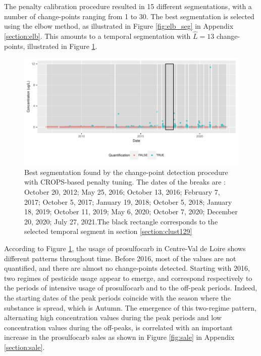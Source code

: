 The penalty calibration procedure resulted in 15 different segmentations, with a number of change-points ranging from 1 to 30. The best segmentation is selected using the elbow method, as illustrated in Figure \ref{fig:elb_seg} in Appendix \ref{section:elb}. This amounts to a temporal segmentation with $\hat L=13$ change-points, illustrated in Figure \ref{fig:seg}. 
 
\begin{figure}[ht]
  \centering
  \includegraphics[]{figs/Chap5/Seg_opt.pdf}
  \caption{Best segmentation found by the change-point detection procedure with CROPS-based penalty tuning. The dates of the breaks are : October 20, 2012; May 25, 2016; October 13, 2016; February 7, 2017; October 5, 2017; January 19, 2018; October 5, 2018; January 18, 2019; October 11, 2019; May 6, 2020; October 7, 2020; December 20, 2020; July 27, 2021.The black rectangle corresponds to the selected temporal segment in section \ref{section:clust129}}\label{fig:seg}
\end{figure}

According to Figure \ref{fig:seg}, the usage of prosulfocarb in Centre-Val de Loire shows different patterns throughout time. Before 2016, most of the values are not quantified, and there are almost no change-points detected. Starting with 2016, two regimes of pesticide usage appear to emerge, and correspond respectively to the periods of intensive usage of prosulfocarb and to the off-peak periods. Indeed, the starting dates of the peak periods coincide with the season where the substance is spread, which is Autumn. The emergence of this two-regime pattern, alternating high concentration values during the peak periods and low concentration values during the off-peaks, is correlated with an important increase in the prosulfocarb sales as shown in Figure \ref{fig:sale} in Appendix \ref{section:sale}. 

